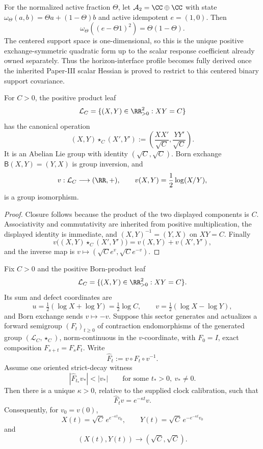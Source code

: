 \documentclass[12pt,a4paper]{article}
\begin{document}
For the normalized active fraction $\Theta$, let
$\mathcal A_2=\CC\oplus\CC$ with state
$\omega_\Theta(a,b)=\Theta a+(1-\Theta)b$ and active idempotent $e=(1,0)$.
Then
\[
 \boxed{\omega_\Theta((e-\Theta1)^2)=\Theta(1-\Theta).}
\]
The centered support space is one-dimensional, so this is the unique positive
exchange-symmetric quadratic form up to the scalar response coefficient
already owned separately.  Thus the horizon-interface profile becomes
fully derived once the inherited Paper-III scalar Hessian is proved to
restrict to this centered binary support covariance.

\begin{proposition}
\label{p8:prop:canonical-born-imbalance-group}
For \(C>0\), the positive product leaf
\[
 \mathcal L_C=\{(X,Y)\in\RR_{>0}^2:XY=C\}
\]
has the canonical operation
\[
 (X,Y)\star_C(X',Y')
 :=
 \left(\frac{XX'}{\sqrt C},\frac{YY'}{\sqrt C}\right).
\]
It is an Abelian Lie group with identity
\((\sqrt C,\sqrt C)\).  Born exchange
\(\mathsf B(X,Y)=(Y,X)\) is group inversion, and
\[
 v:\mathcal L_C\longrightarrow(\RR,+),
 \qquad
 v(X,Y)=\frac12\log(X/Y),
\]
is a group isomorphism.
\end{proposition}

\begin{proof}
Closure follows because the product of the two displayed components is \(C\).
Associativity and commutativity are inherited from positive multiplication,
the displayed identity is immediate, and
\((X,Y)^{-1}=(Y,X)\) on \(XY=C\).  Finally
\[
 v\bigl((X,Y)\star_C(X',Y')\bigr)
 =v(X,Y)+v(X',Y'),
\]
and the inverse map is
\(v\mapsto(\sqrt C e^v,\sqrt C e^{-v})\).
\end{proof}

\begin{theorem}
\label{p8:thm:born-balance-universal-continuation}
Fix \(C>0\) and the positive Born-product leaf
\[
 \mathcal L_C=\{(X,Y)\in\RR_{>0}^2:XY=C\}.
\]
Its sum and defect coordinates are
\[
 u=\tfrac12(\log X+\log Y)=\tfrac12\log C,
 \qquad
 v=\tfrac12(\log X-\log Y),
\]
and Born exchange sends \(v\mapsto-v\).  Suppose this sector generates and
actualizes a forward semigroup \((F_t)_{t\ge0}\) of contraction endomorphisms
of the generated group
\((\mathcal L_C,\star_C)\), norm-continuous in the \(v\)-coordinate, with
\(F_0=I\), exact composition \(F_{s+t}=F_sF_t\).  Write
\[
 \widehat F_t:=v\circ F_t\circ v^{-1}.
\]
Assume one oriented strict-decay witness
\[
 |\widehat F_{t_*}v_*|<|v_*|
 \qquad\text{for some }t_*>0,\ v_*\ne0.
\]
Then there is a unique \(\kappa>0\), relative to the supplied clock
calibration, such that
\[
 \boxed{\widehat F_t v=e^{-\kappa t}v.}
\]
Consequently, for \(v_0=v(0)\),
\[
 \boxed{
 X(t)=\sqrt C\,e^{e^{-\kappa t}v_0},
 \qquad
 Y(t)=\sqrt C\,e^{-e^{-\kappa t}v_0}}
\]
and
\[
 (X(t),Y(t))\longrightarrow(\sqrt C,\sqrt C).
\]
\end{theorem}
\end{document}
